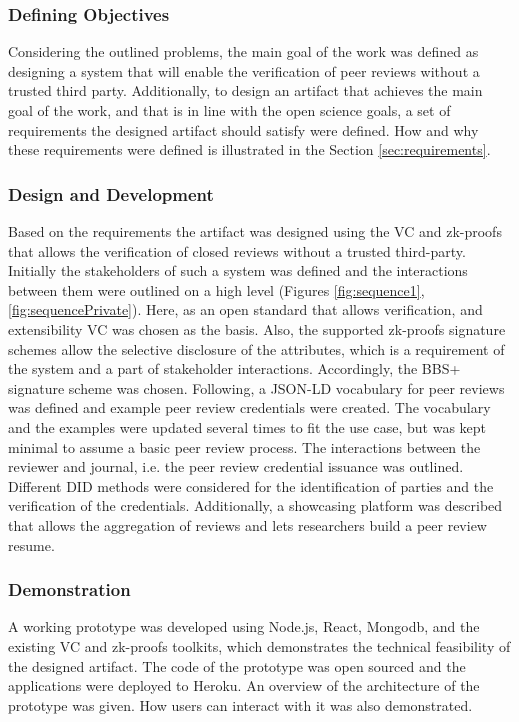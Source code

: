 \subsubsection{Defining Objectives}

Considering the outlined problems, the main goal of the work was defined as designing a system that will enable the verification of peer reviews without a trusted third party. Additionally, to design an artifact that achieves the main goal of the work, and that is in line with the open science goals, a set of requirements the designed artifact should satisfy were defined. How and why these requirements were defined is illustrated in the Section \ref{sec:requirements}.

\subsubsection{Design and Development}

Based on the requirements the artifact was designed using the \acrlong{VC} and \acrlong{zk-proofs} that allows the verification of closed reviews without a trusted third-party. Initially the stakeholders of such a system was defined and the interactions between them were outlined on a high level (Figures \ref{fig:sequence1}, \ref{fig:sequencePrivate}). Here, as an open standard that allows verification, and extensibility \acrlong{VC} was chosen as the basis. Also, the supported \acrshort{zk-proofs} signature schemes allow the selective disclosure of the attributes, which is a requirement of the system and a part of stakeholder interactions. Accordingly, the BBS+ signature scheme was chosen. Following, a \acrshort{JSON-LD} vocabulary for peer reviews was defined and example peer review credentials were created. The vocabulary and the examples were updated several times to fit the use case, but was kept minimal to assume a basic peer review process. The interactions between the reviewer and journal, i.e. the peer review credential issuance was outlined. Different \acrshort{DID} methods were considered for the identification of parties and the verification of the credentials. Additionally, a showcasing platform was described that allows the aggregation of reviews and lets researchers build a peer review resume. 

\subsubsection{Demonstration}

A working prototype was developed using Node.js, React, Mongodb, and the existing \acrshort{VC} and \acrshort{zk-proofs} toolkits, which demonstrates the technical feasibility of the designed artifact. The code of the prototype was open sourced and the applications were deployed to Heroku. An overview of the architecture of the prototype was given. How users can interact with it was also demonstrated.

